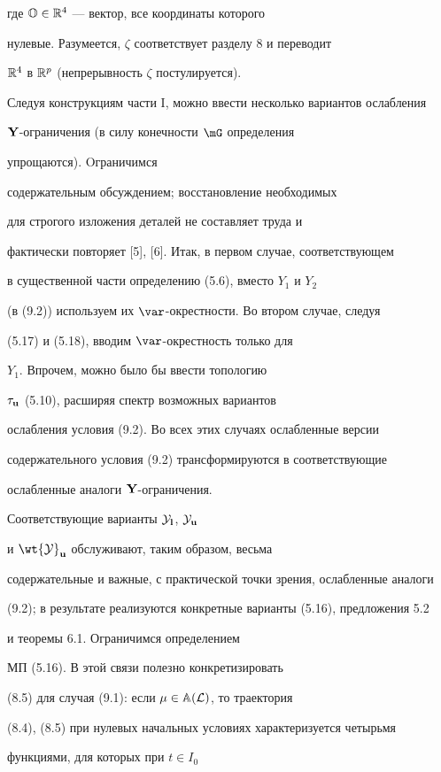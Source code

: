 где ${\Bbb O} \in {{\Bbb R}^4}$ --- вектор, все координаты которого


нулевые. Разумеется, $\zeta$ соответствует разделу 8 и переводит


${\Bbb R}^4$ в ${{\Bbb R}^p}$ (непрерывность $\zeta$ постулируется).


Следуя конструкциям части I, можно ввести несколько вариантов ослабления


${\bold Y}$-ограничения (в силу конечности $\mG$ определения


упрощаются). Oграничимся


содержательным обсуждением; восстановление необходимых


для строгого изложения деталей не составляет труда и


фактически повторяет [5], [6]. Итак, в первом случае, соответствующем


в существенной части определению (5.6), вместо $Y_1$ и $Y_2$


(в (9.2)) используем их $\var$-окрестности. Во втором случае, следуя


(5.17) и (5.18), вводим $\var$-окрестность только для


${Y_1}$. Впрочем, можно было бы ввести топологию


$\tau_{\bold u}$ (5.10), расширяя спектр возможных вариантов


ослабления условия (9.2). Во всех этих случаях ослабленные версии


содержательного условия (9.2) трансформируются в соответствующие


ослабленные аналоги ${\bold Y}$-ограничения.


Соответствующие варианты ${{\cal Y}_{\bold l}}$, ${{\cal Y}_{\bold u}}$


и ${\wt {\cal Y}}_{\bold u}$ обслуживают, таким образом, весьма


содержательные и важные, с практической точки зрения, ослабленные аналоги


(9.2); в результате реализуются конкретные варианты (5.16), предложения 5.2


и теоремы 6.1. Ограничимся определением


МП (5.16). В этой связи полезно конкретизировать


(8.5) для случая (9.1): если $\mu \in {{\Bbb A}({\cal L})}$, то траектория


(8.4), (8.5) при нулевых начальных условиях характеризуется четырьмя


функциями, для которых при $t \in {I_0}$


